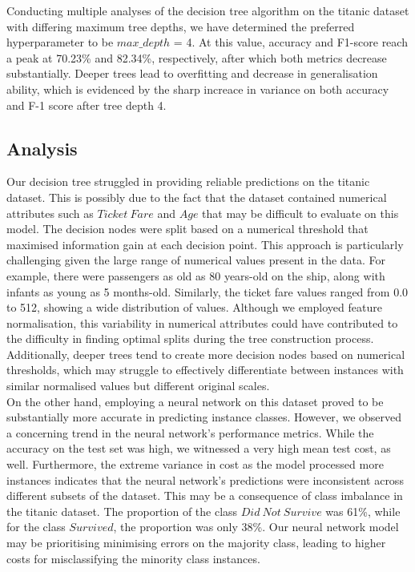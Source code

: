 \documentclass{article}
\begin{document}
Conducting multiple analyses of the decision tree algorithm on the titanic dataset with differing maximum tree depths,
we have determined the preferred hyperparameter to be $max\_depth$ = 4. 
At this value, accuracy and F1-score reach a peak at 70.23\% and 82.34\%, respectively, after which both metrics decrease substantially.
Deeper trees lead to overfitting and decrease in generalisation ability, 
which is evidenced by the sharp increace in variance on both accuracy and F-1 score after tree depth 4.


\subsection*{Analysis}
Our decision tree struggled in providing reliable predictions on the titanic dataset. 
This is possibly due to the fact that the dataset contained numerical attributes such as $Ticket\ Fare$ and $Age$
that may be difficult to evaluate on this model.
The decision nodes were split based on a numerical threshold that maximised information gain at each decision point.
This approach is particularly challenging given the large range of numerical values present in the data.
For example, there were passengers as old as 80 years-old on the ship, along with infants as young as 5 months-old.
Similarly, the ticket fare values ranged from 0.0 to 512, showing a wide distribution of values. 
Although we employed feature normalisation, this variability in numerical attributes could have contributed to 
the difficulty in finding optimal splits during the tree construction process. 
Additionally, deeper trees tend to create more decision nodes based on numerical thresholds, 
which may struggle to effectively differentiate between instances with similar normalised values but different original scales.
\\

On the other hand, employing a neural network on this dataset proved to be substantially more accurate in predicting instance classes.
However, we observed a concerning trend in the neural network's performance metrics. 
While the accuracy on the test set was high, we witnessed a very high mean test cost, as well.
Furthermore, the extreme variance in cost as the model processed more instances
indicates that the neural network's predictions were inconsistent across different subsets of the dataset.
This may be a consequence of class imbalance in the titanic dataset.
The proportion of the class $Did\ Not\ Survive$ was 61\%, 
while for the class $Survived$, the proportion was only 38\%.
Our neural network model may be prioritising minimising errors on the majority class, 
leading to higher costs for misclassifying the minority class instances.
\end{document}

